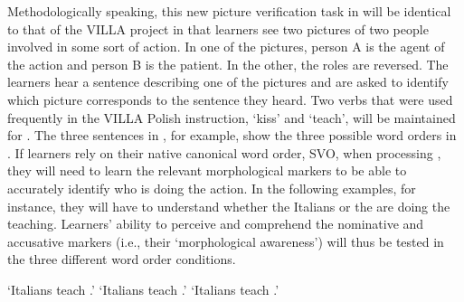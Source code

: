 \documentclass[output=paper,colorlinks,citecolor=brown,modfonts,nonflat]{../langscibook}
\begin{document}

\label{sec:watorek:4.2.2.1}

Methodologically speaking, this new picture verification task in  will be identical to that of the VILLA project in that learners see two pictures of two people involved in some sort of action. In one of the pictures, person A is the agent of the action and person B is the patient. In the other, the roles are reversed. The learners hear a sentence describing one of the pictures and are asked to identify which picture corresponds to the sentence they heard. Two verbs that were used frequently in the VILLA Polish instruction, ‘kiss’ and ‘teach’, will be maintained for . The three sentences in , for example, show the three possible word orders in . If learners rely on their native  canonical word order, SVO, when processing , they will need to learn the relevant morphological markers to be able to accurately identify who is doing the action. In the following examples, for instance, they will have to understand whether the Italians or the  are doing the teaching. Learners’ ability to perceive and comprehend the nominative and accusative markers (i.e., their ‘morphological awareness’) will thus be tested in the three different word order conditions.

\ea%
    \label{ex:watorek:7}
        \glt    ‘Italians teach .’
        \glt    ‘Italians teach .’
        \glt    ‘Italians teach .’
    \z
\z
\end{document}
